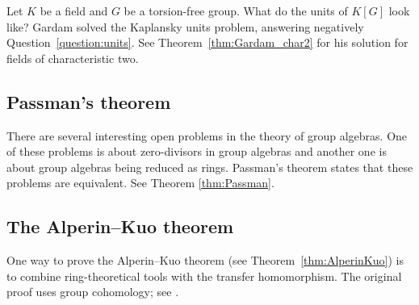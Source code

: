 Let $K$ be a field and $G$ be a torsion-free group.
What do the units of $K[G]$ look like? 
Gardam solved the Kaplansky units problem, answering 
negatively Question~\ref{question:units}. 
See Theorem~\ref{thm:Gardam_char2} for his solution
for fields of characteristic two.  

\subsection*{Passman's theorem}

There are several interesting open problems in the theory of group algebras. One 
of these problems is about zero-divisors in group algebras and another one 
is about group algebras being reduced as rings. Passman's theorem states
that these problems are equivalent. See Theorem \ref{thm:Passman}. 

\subsection*{The Alperin--Kuo theorem}

One way to prove the Alperin--Kuo theorem (see Theorem~\ref{thm:AlperinKuo}) 
is to combine 
ring-theoretical tools with the transfer homomorphism. The original 
proof uses group cohomology; see \cite{MR214674}. 
